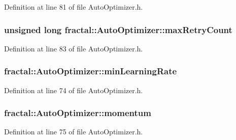 Definition at line 81 of file Auto\+Optimizer.\+h.

\hypertarget{classfractal_1_1AutoOptimizer_a2cf0c04067aba8fd08551d9a973d3de3}{
\subsubsection[{max\+Retry\+Count}]{\setlength{\rightskip}{0pt plus 5cm}unsigned long fractal\+::\+Auto\+Optimizer\+::max\+Retry\+Count\hspace{0.3cm}{\ttfamily [protected]}}}\label{classfractal_1_1AutoOptimizer_a2cf0c04067aba8fd08551d9a973d3de3}


Definition at line 83 of file Auto\+Optimizer.\+h.

\hypertarget{classfractal_1_1AutoOptimizer_aefc6501717ce6fc3ad1ea83ee8743c01}{
\subsubsection[{min\+Learning\+Rate}]{ fractal\+::\+Auto\+Optimizer\+::min\+Learning\+Rate\hspace{0.3cm}{\ttfamily [protected]}}}\label{classfractal_1_1AutoOptimizer_aefc6501717ce6fc3ad1ea83ee8743c01}


Definition at line 74 of file Auto\+Optimizer.\+h.

\hypertarget{classfractal_1_1AutoOptimizer_a06a388ab208b871f47edd111aad33f78}{
\subsubsection[{momentum}]{ fractal\+::\+Auto\+Optimizer\+::momentum\hspace{0.3cm}{\ttfamily [protected]}}}\label{classfractal_1_1AutoOptimizer_a06a388ab208b871f47edd111aad33f78}


Definition at line 75 of file Auto\+Optimizer.\+h.


